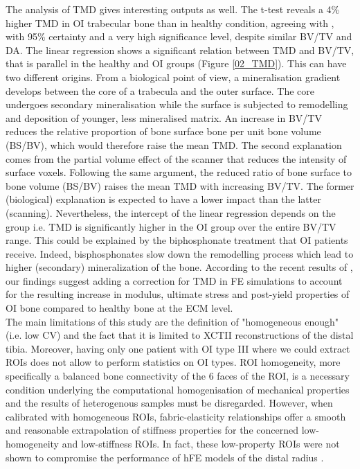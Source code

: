 \documentclass[a4paper,fleqn]{DC_ArtStyle}
\newcommand{\Add}[1]{{\color{blue}{#1}}}
\begin{document}
	The analysis of TMD gives interesting outputs as well. The t-test reveals a 4\% higher TMD in OI trabecular bone than in healthy condition, agreeing with \citeauthor{Boyde1999}\cite{Boyde1999}, with 95\% certainty and a very high significance level, despite similar BV/TV and DA. The linear regression shows a significant relation between TMD and BV/TV, that is parallel in the healthy and OI groups (Figure \ref{02_TMD}). This can have two different origins. From a biological point of view, a mineralisation gradient develops between the core of a trabecula and the outer surface. The core undergoes secondary mineralisation while the surface is subjected to remodelling and deposition of younger, less mineralised matrix. An increase in BV/TV reduces the relative proportion of bone surface bone per unit bone volume (BS/BV), which would therefore raise the mean TMD. The second explanation comes from the partial volume effect of the scanner that reduces the intensity of surface voxels. Following the same argument, the reduced ratio of bone surface to bone volume (BS/BV) raises the mean TMD with increasing BV/TV. The former (biological) explanation is expected to have a lower impact than the latter (scanning). Nevertheless, the intercept of the linear regression depends on the group i.e. TMD is significantly higher in the OI group over the entire BV/TV range. This could be explained by the biphosphonate treatment that OI patients receive. Indeed, bisphosphonates slow down the remodelling process which lead to higher (secondary) mineralization of the bone. According to the recent results of \citeauthor{Indermaur2021}\cite{Indermaur2021}, our findings suggest adding a correction for TMD in FE simulations to account for the resulting increase in modulus, ultimate stress and post-yield properties of OI bone compared to healthy bone at the ECM level.\\
	
	The main limitations of this study are the definition of "homogeneous enough" (i.e. low CV) and the fact that it is limited to XCTII reconstructions of the distal tibia. Moreover, having only one patient with OI type III where we could extract ROIs does not allow to perform statistics on OI types. \Add{Nevertheless, the lack of homogeneous type III ROIs is essentially due to the lack of trabecular bone in which case no relationship is needed. No outlier and no evidence of a different relationship was seen in our results for any OI type including the sample with OI type III.} ROI homogeneity, more specifically a balanced bone connectivity of the 6 faces of the ROI, is a necessary condition underlying the computational homogenisation of mechanical properties and the results of heterogenous samples must be disregarded. However, when calibrated with homogeneous ROIs, fabric-elas\-ticity relationships offer a smooth and reasonable extrapolation of stiffness properties for the concerned low-homogeneity and low-stiffness ROIs. In fact, these low-property ROIs were not shown to compromise the performance of hFE models of the distal radius \cite{Varga2011, Hosseini2017, AriasMoreno2019}.\\
	
\end{document}
